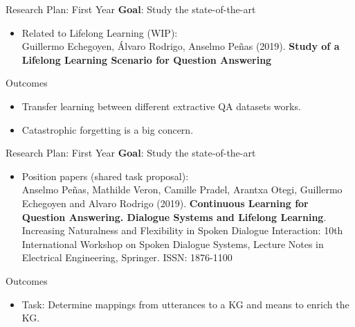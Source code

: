 \documentclass{beamer}
\begin{document}
\begin{frame}{Research Plan: First Year}
  \alert{\textbf{Goal}}: Study the state-of-the-art
  \vspace{0.2cm}
  \begin{itemize}
    \item Related to Lifelong Learning (WIP): \\
      {\small Guillermo Echegoyen, Álvaro Rodrigo, Anselmo Peñas (2019). \textbf{Study of a Lifelong Learning Scenario for Question Answering}}
  \end{itemize}
  \begin{block}{Outcomes}
    \begin{itemize}
      \item Transfer learning between different extractive QA datasets works.
      \item Catastrophic forgetting is a big concern.
    \end{itemize}
  \end{block}
\end{frame}

\begin{frame}{Research Plan: First Year}
  \vspace{-0.1cm}
  \alert{\textbf{Goal}}: Study the state-of-the-art
  \vspace{0.1cm}
  \begin{itemize}
    \item Position papers (shared task proposal): \\
      {\small Anselmo Peñas, Mathilde Veron, Camille Pradel, Arantxa Otegi, Guillermo Echegoyen and Alvaro Rodrigo (2019). \textbf{Continuous Learning for Question Answering. Dialogue Systems and Lifelong Learning}. Increasing Naturalness and Flexibility in Spoken Dialogue Interaction: 10th International Workshop on Spoken Dialogue Systems, Lecture Notes in Electrical Engineering, Springer. ISSN: 1876-1100 \cite{penas2019continuous}}
  \end{itemize}
  \begin{block}{Outcomes}
    \begin{itemize}
      \item Task: Determine mappings from utterances to a KG and means to enrich the KG.
    \end{itemize}
  \end{block}
\end{frame}
\end{document}
